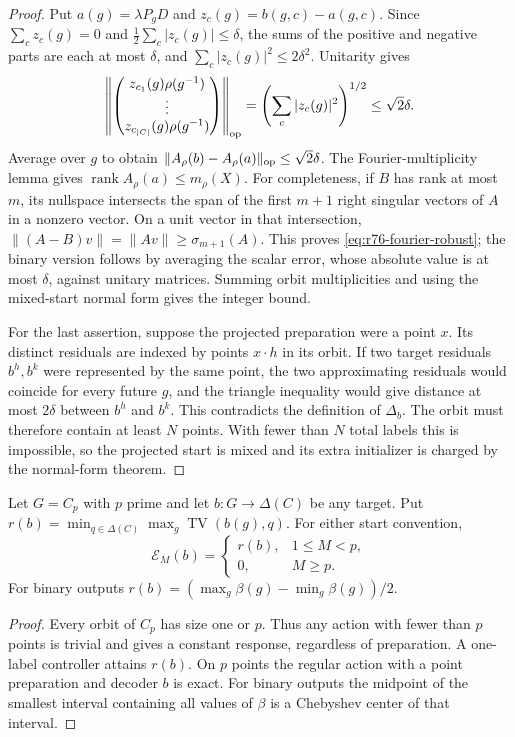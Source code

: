 \begin{proof}
Put $a(g)=\lambda P_gD$ and $z_c(g)=b(g,c)-a(g,c)$.
Since $\sum_cz_c(g)=0$ and $\tfrac12\sum_c|z_c(g)|\le\delta$,
the sums of the positive and negative parts are each at most $\delta$,
and $\sum_c|z_c(g)|^2\le2\delta^2$. Unitarity gives
\[
 \left\|\begin{pmatrix}z_{c_1}(g)\rho(g^{-1})\\
                  \vdots\\z_{c_{|C|}}(g)\rho(g^{-1})\end{pmatrix}
       \right\|_{\rm op}
 =\left(\sum_c|z_c(g)|^2\right)^{1/2}\le\sqrt2\delta.
\]
Average over $g$ to obtain
$\|A_\rho(b)-A_\rho(a)\|_{\rm op}\le\sqrt2\delta$.
The Fourier-multiplicity lemma gives
$\operatorname{rank}A_\rho(a)\le m_\rho(X)$.
For completeness, if $B$ has rank at most $m$, its nullspace
intersects the span of the first $m+1$ right singular vectors of $A$
in a nonzero vector. On a unit vector in that intersection,
$\|(A-B)v\|=\|Av\|\ge\sigma_{m+1}(A)$.
This proves \eqref{eq:r76-fourier-robust}; the binary version follows
by averaging the scalar error, whose absolute value is at most
$\delta$, against unitary matrices. Summing orbit multiplicities and
using the mixed-start normal form gives the integer bound.

For the last assertion, suppose the projected preparation were a point
$x$. Its distinct residuals are indexed by points $x\cdot h$ in its
orbit. If two target residuals $b^h,b^k$ were represented by the same
point, the two approximating residuals would coincide for every future
$g$, and the triangle inequality would give distance at most $2\delta$
between $b^h$ and $b^k$. This contradicts the definition of $\Delta_b$.
The orbit must therefore contain at least $N$ points. With fewer than
$N$ total labels this is impossible, so the projected start is mixed
and its extra initializer is charged by the normal-form theorem.
\end{proof}

\begin{corollary}
\label{cor:r76-prime-error}
Let $G=C_p$ with $p$ prime and let $b:G\to\Delta(C)$ be any target.
Put $r(b)=\min_{q\in\Delta(C)}\max_g\operatorname{TV}(b(g),q)$.
For either start convention,
\[
 \mathcal E_M(b)=
 \begin{cases}r(b),&1\le M<p,\\0,&M\ge p.\end{cases}
\]
For binary outputs $r(b)=(\max_g\beta(g)-\min_g\beta(g))/2$.
\end{corollary}
\begin{proof}
Every orbit of $C_p$ has size one or $p$. Thus any action with fewer
than $p$ points is trivial and gives a constant response, regardless
of preparation. A one-label controller attains $r(b)$. On $p$ points
the regular action with a point preparation and decoder $b$ is exact.
For binary outputs the midpoint of the smallest interval containing
all values of $\beta$ is a Chebyshev center of that interval.
\end{proof}

